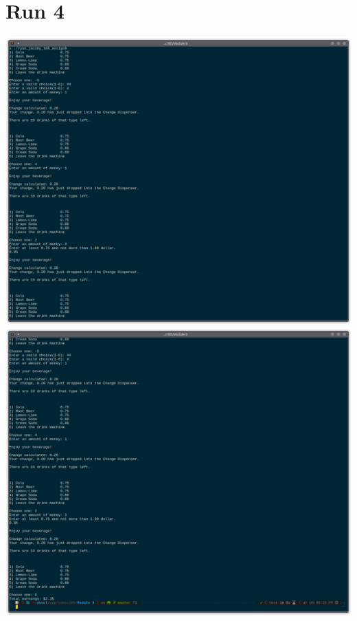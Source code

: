\documentclass[letterpaper, 11pt]{article}
\begin{document}
\section*{Run 4}
\includegraphics[scale=0.5]{run4_1.png}
\clearpage
\includegraphics[scale=0.5]{run4_2.png}
\clearpage
\end{document}
